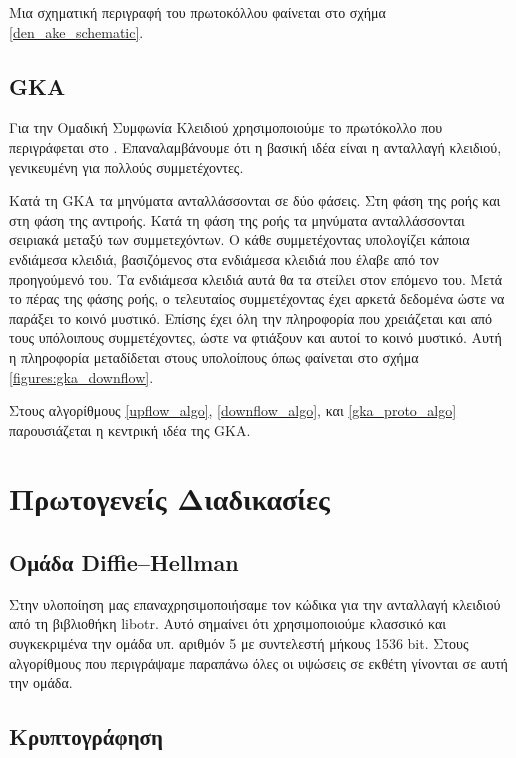 Μια σχηματική περιγραφή του πρωτοκόλλου φαίνεται στο σχήμα \ref{den_ake_schematic}.


\subsection{GKA}
\label{gka_subprot}


Για την Ομαδική Συμφωνία Κλειδιού χρησιμοποιούμε το πρωτόκολλο που πε\-ρι\-γρά\-φε\-ται στο \cite{mpenc}.
Επαναλαμβάνουμε ότι η βασική ιδέα είναι η \dhname ανταλλαγή κλειδιού, γενικευμένη για πολλούς συμμετέχοντες.

Κατά τη GKA τα μηνύματα ανταλλάσσονται σε δύο φάσεις. Στη φάση της ροής και στη φάση της αντιροής.
Κατά τη φάση της ροής τα μηνύματα ανταλλάσσονται σειριακά μεταξύ των συμμετεχόντων.
Ο κάθε συμμετέχοντας υπολογίζει κάποια ενδιάμεσα κλειδιά, βασιζόμενος στα ενδιάμεσα κλειδιά που έλαβε από τον προηγούμενό του.
Τα ενδιάμεσα κλειδιά αυτά θα τα στείλει στον επόμενο του.
Μετά το πέρας της φάσης ροής, ο τελευταίος συμμετέχοντας έχει αρκετά δεδομένα ώστε να παράξει το κοινό μυστικό.
Επίσης έχει όλη την πληροφορία που χρειάζεται και από τους υπόλοιπους συμμετέχοντες, ώστε να φτιάξουν και αυτοί το κοινό μυστικό.
Αυτή η πληροφορία μεταδίδεται στους υπολοίπους όπως φαίνεται στο σχήμα \ref{figures:gka_downflow}.

Στους αλγορίθμους \ref{upflow_algo}, \ref{downflow_algo}, και \ref{gka_proto_algo} παρουσιάζεται η κεντρική ιδέα της GKA.


\section{Πρωτογενείς Διαδικασίες}

\subsection{Ομάδα Diffie--Hellman}

Στην υλοποίηση μας επαναχρησιμοποιήσαμε τον κώδικα για την ανταλλαγή κλειδιού \dhname από τη βιβλιοθήκη libotr.
Αυτό σημαίνει ότι χρη\-σι\-μο\-ποι\-ού\-με κλασσικό \dhname και συγκεκριμένα την ομάδα υπ. αριθμόν 5 με συν\-τε\-λε\-στή μήκους 1536 bit.
Στους αλγορίθμους που περιγράψαμε παραπάνω όλες οι υψώσεις σε εκθέτη γίνονται σε αυτή την ομάδα.

\subsection{Κρυπτογράφηση}


